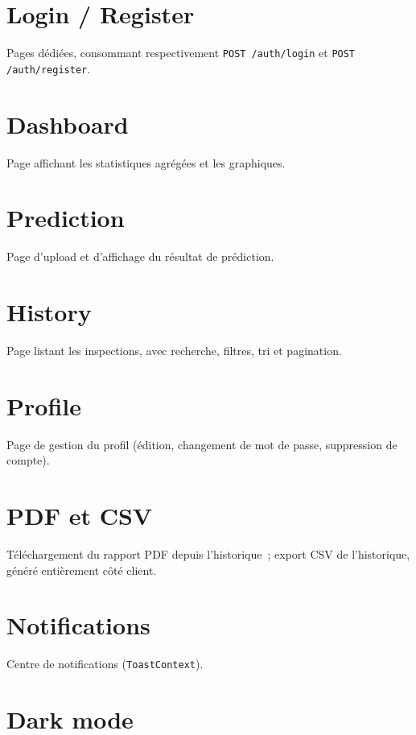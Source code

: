 \section{Login / Register}

Pages d\'edi\'ees, consommant respectivement \texttt{POST /auth/login} et \texttt{POST /auth/register}.

\section{Dashboard}

Page affichant les statistiques agr\'eg\'ees et les graphiques.

\section{Prediction}

Page d'upload et d'affichage du r\'esultat de pr\'ediction.

\section{History}

Page listant les inspections, avec recherche, filtres, tri et pagination.

\section{Profile}

Page de gestion du profil (\'edition, changement de mot de passe, suppression de compte).

\section{PDF et CSV}

T\'el\'echargement du rapport PDF depuis l'historique~; export CSV de l'historique, g\'en\'er\'e enti\`erement c\^ot\'e client.

\section{Notifications}

Centre de notifications (\texttt{ToastContext}).

\section{Dark mode}

